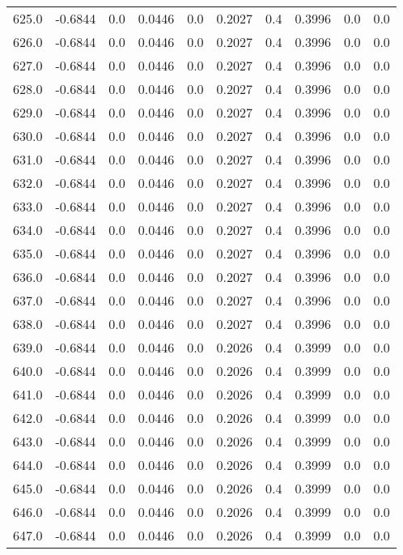 \begin{longtable}{lrrrrrrrrr}
625.0 & -0.6844 & 0.0 & 0.0446 & 0.0 & 0.2027 & 0.4 & 0.3996 & 0.0 & 0.0 \\
626.0 & -0.6844 & 0.0 & 0.0446 & 0.0 & 0.2027 & 0.4 & 0.3996 & 0.0 & 0.0 \\
627.0 & -0.6844 & 0.0 & 0.0446 & 0.0 & 0.2027 & 0.4 & 0.3996 & 0.0 & 0.0 \\
628.0 & -0.6844 & 0.0 & 0.0446 & 0.0 & 0.2027 & 0.4 & 0.3996 & 0.0 & 0.0 \\
629.0 & -0.6844 & 0.0 & 0.0446 & 0.0 & 0.2027 & 0.4 & 0.3996 & 0.0 & 0.0 \\
630.0 & -0.6844 & 0.0 & 0.0446 & 0.0 & 0.2027 & 0.4 & 0.3996 & 0.0 & 0.0 \\
631.0 & -0.6844 & 0.0 & 0.0446 & 0.0 & 0.2027 & 0.4 & 0.3996 & 0.0 & 0.0 \\
632.0 & -0.6844 & 0.0 & 0.0446 & 0.0 & 0.2027 & 0.4 & 0.3996 & 0.0 & 0.0 \\
633.0 & -0.6844 & 0.0 & 0.0446 & 0.0 & 0.2027 & 0.4 & 0.3996 & 0.0 & 0.0 \\
634.0 & -0.6844 & 0.0 & 0.0446 & 0.0 & 0.2027 & 0.4 & 0.3996 & 0.0 & 0.0 \\
635.0 & -0.6844 & 0.0 & 0.0446 & 0.0 & 0.2027 & 0.4 & 0.3996 & 0.0 & 0.0 \\
636.0 & -0.6844 & 0.0 & 0.0446 & 0.0 & 0.2027 & 0.4 & 0.3996 & 0.0 & 0.0 \\
637.0 & -0.6844 & 0.0 & 0.0446 & 0.0 & 0.2027 & 0.4 & 0.3996 & 0.0 & 0.0 \\
638.0 & -0.6844 & 0.0 & 0.0446 & 0.0 & 0.2027 & 0.4 & 0.3996 & 0.0 & 0.0 \\
639.0 & -0.6844 & 0.0 & 0.0446 & 0.0 & 0.2026 & 0.4 & 0.3999 & 0.0 & 0.0 \\
640.0 & -0.6844 & 0.0 & 0.0446 & 0.0 & 0.2026 & 0.4 & 0.3999 & 0.0 & 0.0 \\
641.0 & -0.6844 & 0.0 & 0.0446 & 0.0 & 0.2026 & 0.4 & 0.3999 & 0.0 & 0.0 \\
642.0 & -0.6844 & 0.0 & 0.0446 & 0.0 & 0.2026 & 0.4 & 0.3999 & 0.0 & 0.0 \\
643.0 & -0.6844 & 0.0 & 0.0446 & 0.0 & 0.2026 & 0.4 & 0.3999 & 0.0 & 0.0 \\
644.0 & -0.6844 & 0.0 & 0.0446 & 0.0 & 0.2026 & 0.4 & 0.3999 & 0.0 & 0.0 \\
645.0 & -0.6844 & 0.0 & 0.0446 & 0.0 & 0.2026 & 0.4 & 0.3999 & 0.0 & 0.0 \\
646.0 & -0.6844 & 0.0 & 0.0446 & 0.0 & 0.2026 & 0.4 & 0.3999 & 0.0 & 0.0 \\
647.0 & -0.6844 & 0.0 & 0.0446 & 0.0 & 0.2026 & 0.4 & 0.3999 & 0.0 & 0.0 \\

\end{longtable}
